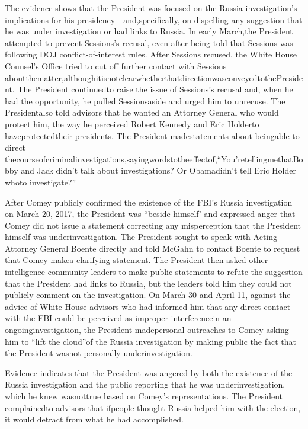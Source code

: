 The evidence shows that the President was focused on the Russia investigation’s implications for his presidency—and,specifically, on dispelling any suggestion that he was under investigation or had links to Russia. In early March,the President attempted to prevent Sessions’s recusal, even after being told that Sessions was following DOJ conflict-of-interest rules. After Sessions recused, the White House Counsel’s Office tried to cut off further contact with Sessions aboutthematter,althoughitisnotclearwhetherthatdirectionwasconveyedtothePresident. The President continuedto raise the issue of Sessions’s recusal and, when he had the opportunity, he pulled Sessionsaside and urged him to unrecuse. The Presidentalso told advisors that he wanted an Attorney General who would protect him, the way he perceived Robert Kennedy and Eric Holderto haveprotectedtheir presidents. The President madestatements about beingable to direct thecourseofcriminalinvestigations,sayingwordstotheeffectof,“You’retellingmethatBobby and Jack didn’t talk about investigations? Or Obamadidn’t tell Eric Holder whoto investigate?”

After Comey publicly confirmed the existence of the FBI’s Russia investigation on March 20, 2017, the President was “beside himself’ and expressed anger that Comey did not issue a statement correcting any misperception that the President himself was underinvestigation. The President sought to speak with Acting Attorney General Boente directly and told McGahn to contact Boente to request that Comey makea clarifying statement. The President then asked other
intelligence community leaders to make public statements to refute the suggestion that the President had links to Russia, but the leaders told him they could not publicly comment on the investigation. On March 30 and April 11, against the advice of White House advisors who had informed him that any direct contact with the FBI could be perceived as improper interferencein an ongoinginvestigation, the President madepersonal outreaches to Comey asking him to “lift the cloud”of the Russia investigation by making public the fact that the President wasnot personally underinvestigation.

Evidence indicates that the President was angered by both the existence of the Russia investigation and the public reporting that he was underinvestigation, which he knew wasnottrue based on Comey’s representations. The President complainedto advisors that ifpeople thought Russia helped him with the election, it would detract from what he had accomplished.

